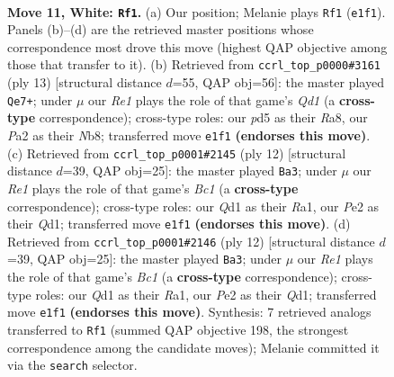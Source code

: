 \documentclass[11pt]{article}
\begin{document}
\clearpage

\begin{figure}[p]\centering
\begin{subfigure}{0.46\textwidth}\centering
\resizebox{\linewidth}{!}{%
\newchessgame
\chessboard[
  setfen={rnbqk2r/6p1/2pb1n2/pp1p1p1p/3P4/4BNP1/PP2PPBP/RN1QR1K1 w kq - 0 11},
  showmover=false,
  pgfstyle=straightmove, color=movearrow, markmove={e1-f1}
]}
\caption{}
\end{subfigure}\hfill
\begin{subfigure}{0.46\textwidth}\centering
\resizebox{\linewidth}{!}{%
\newchessgame
\chessboard[
  setfen={rnbqkb1r/1pp2p1p/p4np1/2Pp4/3P4/3B1N2/PP3PPP/RNBQK2R b KQkq - 1 7},
  showmover=false,
  pgfstyle=straightmove, color=movearrow, markmove={d8-e7}
]}
\caption{}
\end{subfigure}
\\[4pt]
\begin{subfigure}{0.46\textwidth}\centering
\resizebox{\linewidth}{!}{%
\newchessgame
\chessboard[
  setfen={rnbqk2r/pp4pp/2pbpn2/3p1p2/3P4/1P3NP1/P1P1PPBP/RNBQ1RK1 w kq - 2 7},
  showmover=false,
  pgfstyle=straightmove, color=movearrow, markmove={c1-a3}
]}
\caption{}
\end{subfigure}\hfill
\begin{subfigure}{0.46\textwidth}\centering
\resizebox{\linewidth}{!}{%
\newchessgame
\chessboard[
  setfen={rnbqk2r/pp4pp/2pbpn2/3p1p2/3P4/1P3NP1/P1P1PPBP/RNBQ1RK1 w kq - 2 7},
  showmover=false,
  pgfstyle=straightmove, color=movearrow, markmove={c1-a3}
]}
\caption{}
\end{subfigure}
\caption{\textbf{Move 11, White: \texttt{Rf1}.} (a) Our position; Melanie plays \texttt{Rf1} (\texttt{e1f1}). Panels (b)--(d) are the retrieved master positions whose correspondence most drove this move (highest QAP objective among those that transfer to it). (b) Retrieved from \texttt{ccrl\_top\_p0000\#3161} (ply 13) [structural distance $d$=55, QAP obj=56]: the master played \texttt{Qe7+}; under $\mu$ our \emph{Re1} plays the role of that game's \emph{Qd1} (a \textbf{cross-type} correspondence); cross-type roles: our \emph{p}d5 as their \emph{R}a8, our \emph{P}a2 as their \emph{N}b8; transferred move \texttt{e1f1} \textbf{(endorses this move)}. (c) Retrieved from \texttt{ccrl\_top\_p0001\#2145} (ply 12) [structural distance $d$=39, QAP obj=25]: the master played \texttt{Ba3}; under $\mu$ our \emph{Re1} plays the role of that game's \emph{Bc1} (a \textbf{cross-type} correspondence); cross-type roles: our \emph{Q}d1 as their \emph{R}a1, our \emph{P}e2 as their \emph{Q}d1; transferred move \texttt{e1f1} \textbf{(endorses this move)}. (d) Retrieved from \texttt{ccrl\_top\_p0001\#2146} (ply 12) [structural distance $d$=39, QAP obj=25]: the master played \texttt{Ba3}; under $\mu$ our \emph{Re1} plays the role of that game's \emph{Bc1} (a \textbf{cross-type} correspondence); cross-type roles: our \emph{Q}d1 as their \emph{R}a1, our \emph{P}e2 as their \emph{Q}d1; transferred move \texttt{e1f1} \textbf{(endorses this move)}. Synthesis: 7 retrieved analogs transferred to \texttt{Rf1} (summed QAP objective 198, the strongest correspondence among the candidate moves); Melanie committed it via the \texttt{search} selector.}

\end{figure}
\end{document}
